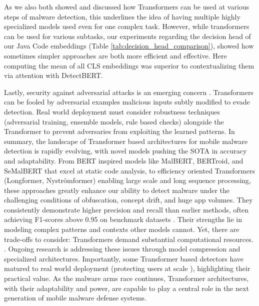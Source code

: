 As we also both showed and discussed how Transformers can be used at various steps
of malware detection, this underlines the idea of having multiple highly specialized models used
even for one complex task.
However, while transformers can be used for various subtasks, our experiments regarding the decision
head of our Java Code embeddings (Table \ref{tab:decision_head_comparison}), 
showed how sometimes simpler approaches are both more efficient and effective. 
Here computing the mean of all CLS embeddings was superior to contextualizing them
via attention with DetectBERT.

Lastly, security against adversarial attacks is an emerging concern \cite{vorlesung}. 
Transformers can be fooled by adversarial examples malicious inputs subtly modified to evade detection. 
Real world deployment must consider robustness techniques (adversarial training, ensemble models, 
rule based checks) alongside the Transformer to prevent adversaries from exploiting the learned 
patterns. 
In summary, the landscape of Transformer based architectures for mobile malware detection is rapidly 
evolving, with novel models pushing the SOTA in accuracy and adaptability. 
From BERT inspired models like MalBERT, BERTroid, and SeMalBERT that excel at static code analysis, 
to efficiency oriented Transformers (Longformer, Nyströmformer) enabling large scale and long sequence 
processing, these approaches greatly enhance our ability to detect malware under the challenging 
conditions of obfuscation, concept drift, and huge app volumes. 
They consistently demonstrate higher precision and recall than earlier methods, 
often achieving F1-scores above 0.95 on benchmark datasets
\cite{malbert_two, bertroid, detectbert}. 
Their strengths lie in modeling complex patterns and contexts other models cannot. 
Yet, there are trade-offs to consider: Transformers demand substantial computational resources.
. Ongoing research is addressing these issues through model compression and specialized architectures. 
Importantly, some Transformer based detectors have matured to real world deployment 
(protecting users at scale
\cite{htgt}), highlighting their practical value. 
As the malware arms race continues, Transformer architectures, with their adaptability and power, 
are capable to play a central role in the next generation of mobile malware defense systems.

